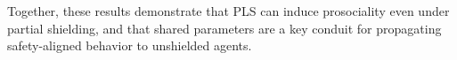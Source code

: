 \documentclass{ecai}
\newcommand{\shieldname}[1]{$\mathcal{T}_{#1}$}
\theoremstyle{plain}
\theoremstyle{definition}
\theoremstyle{remark}
\begin{document}
Together, these results demonstrate that PLS can induce prosociality even under partial shielding, and that shared parameters are a key conduit for propagating safety-aligned behavior to unshielded agents.





\end{document}
